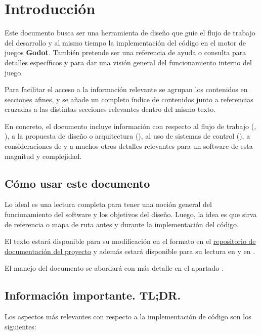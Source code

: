 
\section{Introducción}\label{intro:introduccion}

Este documento busca ser una herramienta de diseño que guie el flujo de trabajo
del desarrollo y al mismo tiempo la implementación del código en el motor de
juegos \textbf{Godot}. También pretende ser una referencia de ayuda o consulta
para detalles específicos y para dar una visión general del funcionamiento
interno del juego.

Para facilitar el acceso a la información relevante se agrupan los contenidos
en secciones afines, y se añade un completo índice de contenidos junto a
referencias cruzadas a las distintas secciones relevantes dentro del mismo
texto.

En concreto, el documento incluye información con respecto al flujo de trabajo
(, ), a la
propuesta de diseño o arquitectura (),
al uso de sistemas de control  (), a
consideraciones de  y a muchos otros
detalles relevantes para un software de esta magnitud y complejidad.

\subsection{Cómo usar este documento}\label{intro:como-usar-el-documento}
Lo ideal es una lectura completa para tener una noción general del
funcionamiento del software y los objetivos del diseño. Luego, la idea es que
sirva de referencia o mapa de ruta antes y durante la implementación del
código.

El texto estará disponible para su modificación en el formato  en el
\href{https://github.com/polirritmico/Bakumapu-docs}{repositorio de
documentación del proyecto} y además estará disponible para su lectura en
\href{https://polirritmico.github.io/Bakumapu-docs/}{} y en
\href{https://github.com/polirritmico/Bakumapu-docs/blob/main/main.pdf}{}.

El manejo del documento se abordará con más detalle en el apartado
.

\subsection{Información importante. TL;DR.}
\noindent Los aspectos más relevantes con respecto a la implementación de
código son los siguientes:

